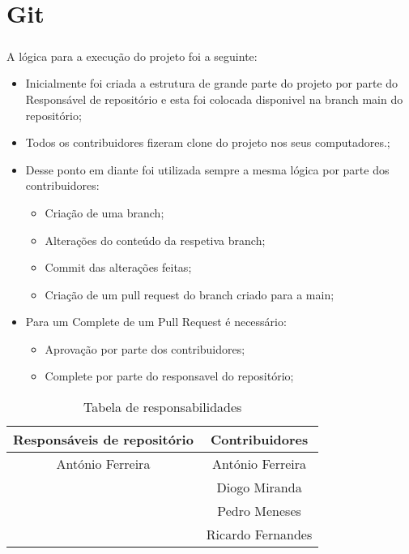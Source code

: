 \chapter*{\thechapter \quad Git}
\paragraph{}

A lógica para a execução do projeto foi a seguinte:
\begin{itemize}
    \item Inicialmente foi criada a estrutura de grande parte do projeto por parte do Responsável de repositório e esta foi colocada disponivel na branch main do repositório;
    \item Todos os contribuidores fizeram clone do projeto nos seus computadores.;
    \item Desse ponto em diante foi utilizada sempre a mesma lógica por parte dos contribuidores:
    \begin{itemize}
    \item Criação de uma branch;
    \item Alterações do conteúdo da respetiva branch;
    \item Commit das alterações feitas;
    \item Criação de um pull request do branch criado para a main;
    \end{itemize}
    
    \item Para um Complete de um Pull Request é necessário:
    \begin{itemize}
    \item Aprovação por parte dos contribuidores;
    \item Complete por parte do responsavel do repositório;
    \end{itemize}
\end{itemize}

\begin{table}
\begin{center}
\begin{tabular}{||c c||} 
 \hline
 Responsáveis de repositório & Contribuidores  \\ [0.5ex] 
 \hline\hline
 António Ferreira & António Ferreira \\ 
 \hline
  & Diogo Miranda \\
 \hline
  & Pedro Meneses \\
 \hline
  & Ricardo Fernandes \\ [1ex] 
 \hline
\end{tabular}
\caption{Tabela de responsabilidades}
\label{table: Tabela de responsabilidades}
\end{center}
\end{table}